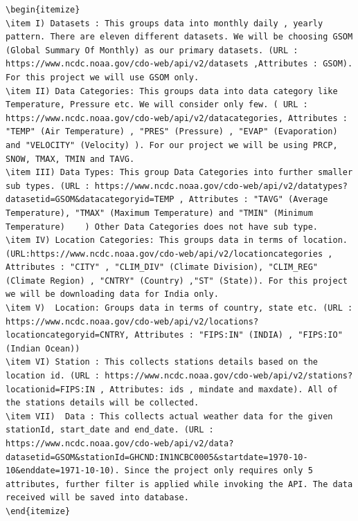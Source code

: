 \documentclass[9pt,twocolumn,twoside]{../../styles/osajnl}
\begin{document}
\begin{verbatim}
\begin{itemize}
\item I) Datasets : This groups data into monthly daily , yearly pattern. There are eleven different datasets. We will be choosing GSOM (Global Summary Of Monthly) as our primary datasets. (URL : https://www.ncdc.noaa.gov/cdo-web/api/v2/datasets ,Attributes : GSOM). For this project we will use GSOM only.	
\item II) Data Categories: This groups data into data category like Temperature, Pressure etc. We will consider only few. ( URL : https://www.ncdc.noaa.gov/cdo-web/api/v2/datacategories, Attributes : "TEMP" (Air Temperature) , "PRES" (Pressure) , "EVAP" (Evaporation) and "VELOCITY" (Velocity) ). For our project we will be using PRCP, SNOW, TMAX, TMIN and TAVG.
\item III) Data Types: This group Data Categories into further smaller sub types. (URL : https://www.ncdc.noaa.gov/cdo-web/api/v2/datatypes?datasetid=GSOM&datacategoryid=TEMP , Attributes : "TAVG" (Average Temperature), "TMAX" (Maximum Temperature) and "TMIN" (Minimum Temperature)    ) Other Data Categories does not have sub type.
\item IV) Location Categories: This groups data in terms of location. (URL:https://www.ncdc.noaa.gov/cdo-web/api/v2/locationcategories , Attributes : "CITY" , "CLIM_DIV" (Climate Division), "CLIM_REG" (Climate Region) , "CNTRY" (Country) ,"ST" (State)). For this project we will be downloading data for India only.
\item V)  Location: Groups data in terms of country, state etc. (URL : https://www.ncdc.noaa.gov/cdo-web/api/v2/locations?locationcategoryid=CNTRY, Attributes : "FIPS:IN" (INDIA) , "FIPS:IO" (Indian Ocean))	
\item VI) Station : This collects stations details based on the location id. (URL : https://www.ncdc.noaa.gov/cdo-web/api/v2/stations?locationid=FIPS:IN , Attributes: ids , mindate and maxdate). All of the stations details will be collected.	
\item VII) 	Data : This collects actual weather data for the given stationId, start_date and end_date. (URL : https://www.ncdc.noaa.gov/cdo-web/api/v2/data?datasetid=GSOM&stationId=GHCND:IN1NCBC0005&startdate=1970-10-10&enddate=1971-10-10). Since the project only requires only 5 attributes, further filter is applied while invoking the API. The data received will be saved into database. 
\end{itemize}


\end{verbatim}
\end{document}
